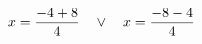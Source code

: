 \documentclass[preview]{standalone}
\begin{document}
\begin{align*}
\special{dvisvgm:raw <g id='unique000'>}x=\frac{-4 + 8}{4} \quad \lor \quad x=\frac{-8 - 4}{4}\special{dvisvgm:raw </g>}
\end{align*}
\end{document}
